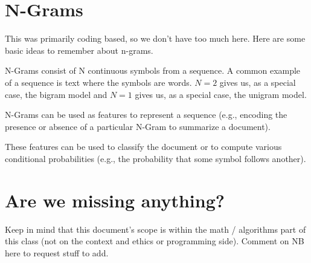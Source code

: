 \documentclass[review_Solutions]{subfiles}
\begin{document}
\ei



\section{N-Grams}
This was primarily coding based, so we don't have too much here.  Here are some basic ideas to remember about n-grams.

\bi
\item N-Grams consist of N continuous symbols from a sequence.  A common example of a sequence is text where the symbols are words.  $N=2$ gives us, as a special case, the bigram model and $N=1$ gives us, as a special case, the unigram model.
\item N-Grams can be used as features to represent a sequence (e.g., encoding the presence or absence of a particular N-Gram to summarize a document).
\item These features can be used to classify the document or to compute various conditional probabilities (e.g., the probability that some symbol follows another).
\ei

\section{Are we missing anything?}
Keep in mind that this document's scope is within the math / algorithms part of this class (not on the context and ethics or programming side).  Comment on NB here to request stuff to add. 
\end{document}
